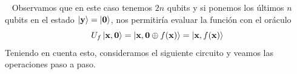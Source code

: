 \documentclass[a4paper]{article}
\numberwithin{equation}{section}
\begin{document}
\begin{figure}[h]
\centering
{}
\end{figure}\ \linebreak
Observamos que en este caso tenemos $2n$ qubits y si ponemos los últimos $n$ qubits en el estado $\ket{\mathbf{y}} = \ket{\mathbf{0}}$, nos permitiría evaluar la función con el oráculo
\begin{equation}
U_f\ket{\mathbf{x}, \mathbf{0}} = \ket{\mathbf{x}, \mathbf{0}\oplus f(\mathbf{x})} = \ket{\mathbf{x}, f(\mathbf{x})}
\end{equation}
Teniendo en cuenta esto, consideramos el siguiente circuito y veamos las operaciones paso a paso.
\end{document}
